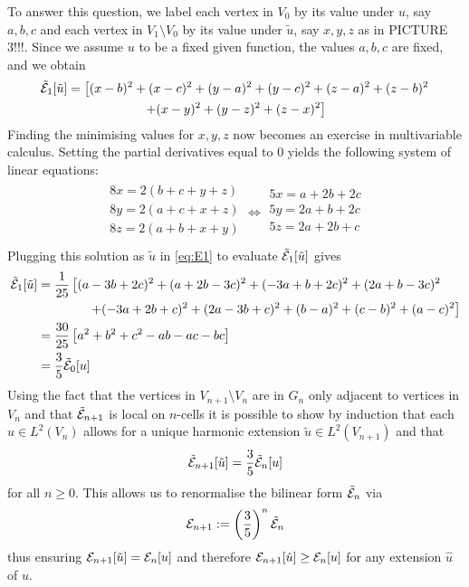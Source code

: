 To answer this question, we label each vertex in $V_0$ by its value under $u$, say $a,b,c$ and each vertex in $V_1\setminus V_0$ by its value under $\tilde u$, say $x,y,z$ as in PICTURE 3!!!. Since we assume $u$ to be a fixed given function, the values $a,b,c$ are fixed, and we obtain 
\begin{multline}\label{eq:E1}
  \tilde{\mathcal{E}}_1[\tilde u]=\left[(x-b)^2+(x-c)^2+(y-a)^2+(y-c)^2+(z-a)^2+(z-b)^2\right.\\
  \left.+(x-y)^2+(y-z)^2+(z-x)^2\right]
\end{multline}
Finding the minimising values for $x,y,z$ now becomes an exercise in multivariable calculus. Setting the partial derivatives equal to 0 yields the following system of linear equations:
\begin{align*}
  \begin{array}{c}
    8x=2(b+c+y+z)\\
    8y=2(a+c+x+z)\\
    8z=2(a+b+x+y)\\
  \end{array}\Longleftrightarrow
  \begin{array}{c}
    5x=a+2b+2c\\
    5y=2a+b+2c\\
    5z=2a+2b+c\\
  \end{array}
\end{align*}
Plugging this solution as $\tilde u$ in \eqref{eq:E1} to evaluate $\tilde{\mathcal{E}}_1[\tilde u]$ gives
\begin{align*}
  \tilde{\mathcal{E}}_1[\tilde u]
  &=\frac{1}{25}\left[(a-3b+2c)^2+(a+2b-3c)^2+(-3a+b+2c)^2
    +(2a+b-3c)^2\right.\\
  &\qquad\qquad \left.+(-3a+2b+c)^2+(2a-3b+c)^2
    +(b-a)^2+(c-b)^2+(a-c)^2\right]\\
  &=\frac{30}{25}\left[a^2+b^2+c^2-ab-ac-bc\right]\\
  &=\frac{3}{5}\tilde{\mathcal{E}}_0[u]
\end{align*}
Using the fact that the vertices in $V_{n+1}\setminus V_n$ are in $G_n$ only adjacent to vertices in $V_n$ and that 
$\tilde{\mathcal{E}}_{n+1}$ is local on $n$-cells it is possible to show by induction that each $u\in L^2(V_n)$ allows for a unique harmonic extension $\tilde u\in L^2(V_{n+1})$ and that 
\[
  \tilde{\mathcal{E}}_{n+1}[\tilde u]=\frac{3}{5}\tilde{\mathcal{E}}_n[u]
\]
for all $n\geq0$. This allows us to renormalise the bilinear form $\tilde{\mathcal{E}}_n$ via 
\[
  \mathcal{E}_{n+1}:=\left(\frac{3}{5}\right)^n\tilde{\mathcal{E}}_n
\]
thus ensuring $\mathcal{E}_{n+1}[\tilde u]=\mathcal{E}_n[u]$ and therefore
$\mathcal{E}_{n+1}[\hat u]\geq\mathcal{E}_n[u]$ for any extension $\hat u$ of $u$.

